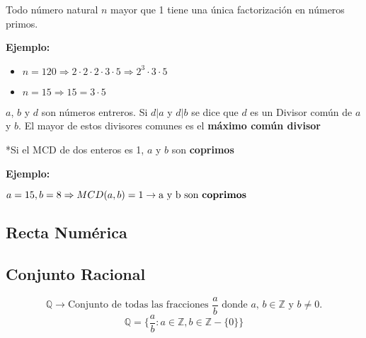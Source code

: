 \documentclass[12pt]{article}
\begin{document}
\begin{tcolorbox}[colback=yellow!5!white,colframe=yellow!50!black,
    colbacktitle=yellow!75!black,title=Teoría fundamental de la artitmética]
    Todo número natural $n$ mayor que 1 tiene una única factorización en números primos.
    \tcblower
    \begin{center}
        \textbf{Ejemplo:}
        \begin{itemize}
            \item {$n = 120 \Rightarrow 2 \cdot 2 \cdot 2 \cdot 3 \cdot 5 \Rightarrow 2^3 \cdot 3 \cdot 5$}
            \item {$n = 15 \Rightarrow 15 = 3 \cdot 5$}
        \end{itemize}
    \end{center}
\end{tcolorbox}

\begin{tcolorbox}[colback=yellow!5!white,colframe=yellow!50!black,
    colbacktitle=yellow!75!black,title=Máximo común divisor - MCD]
    $a$, $b$ y $d$ son números entreros. Si $d|a$ y $d|b$ se dice que $d$ es un Divisor común de $a$ y $b$. El mayor de estos divisores comunes es el \textbf{máximo común divisor}

    *Si el MCD de dos enteros es 1, $a$ y $b$ son \textbf{coprimos}
    \tcblower
    \begin{center}
        \textbf{Ejemplo:}\\
    \end{center}
        $a = 15, b = 8 \Rightarrow MCD(a,b) = 1 \rightarrow \text{a y b son \textbf{coprimos}}$
\end{tcolorbox}

\subsection{Recta Numérica}
\begin{center}
\end{center}

\subsection{Conjunto Racional}
\begin{tcolorbox}[colback=yellow!5!white,colframe=yellow!50!black,
    colbacktitle=yellow!75!black,title={Definición - Conjunto Racional}]
    \[\mathbb{Q} \rightarrow \text{Conjunto de todas las fracciones } \frac{a}{b} \text{ donde } a \text{, } b \in \mathbb{Z} \text{ y } b \neq 0 \text{.}\]
    \[\mathbb{Q} = \bigl\{\frac{a}{b} : a \in \mathbb{Z}, b \in \mathbb{Z} - \{0\} \bigl\} \]
\end{tcolorbox}
\end{document}
